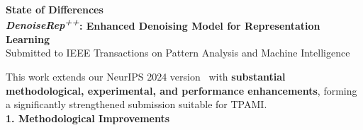 \documentclass[11pt]{article}
\begin{document}
\centering
{\large \textbf{State of Differences}}\\[0.6cm]
{\large \textbf{\textit{DenoiseRep\textsuperscript{++}}: Enhanced Denoising Model for Representation Learning}}\\[0.6cm]
{\large Submitted to IEEE Transactions on Pattern Analysis and Machine Intelligence}\\[0.6cm]

\raggedright

\hspace*{1em}
This work extends our NeurIPS 2024 version~\cite{xu2024denoiserep} with \textbf{substantial methodological, experimental, and performance enhancements}, forming a significantly strengthened submission suitable for TPAMI.\\[1.2em]


\textbf{1. Methodological Improvements}
\end{document}
